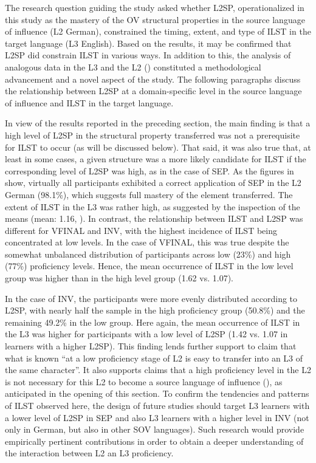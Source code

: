 \documentclass[output=paper,modfonts,nonflat, newtxmath]{langsci/langscibook}
\begin{document}
The research question guiding the study asked whether L2SP, operationalized in this study as the mastery of the OV structural properties in the source language of influence (L2 German), constrained the timing, extent, and type of ILST in the target language (L3 English). Based on the results, it may be confirmed that L2SP did constrain ILST in various ways. In addition to this, the analysis of analogous data in the L3 and the L2 (\citealt{Jarvis2000, FalkBardel2010}) constituted a methodological advancement and a novel aspect of the study. The following paragraphs discuss the relationship between L2SP at a domain-specific level in the source language of influence and ILST in the target language.

In view of the results reported in the preceding section, the main finding is that a high level of L2SP in the structural property transferred was not a prerequisite for ILST to occur (as will be discussed below). That said, it was also true that, at least in some cases, a given structure was a more likely candidate for ILST if the corresponding level of L2SP was high, as in the case of SEP. As the figures in  show, virtually all participants exhibited a correct application of SEP in the L2 German (98.1\%), which suggests full mastery of the element transferred. The extent of ILST in the L3 was rather high, as suggested by the inspection of the means (mean: 1.16, ). In contrast, the relationship between ILST and L2SP was different for VFINAL and INV, with the highest incidence of ILST being concentrated at low levels. In the case of VFINAL, this was true despite the somewhat unbalanced distribution of participants across low (23\%) and high (77\%) proficiency levels. Hence, the mean occurrence of ILST in the low level group was higher than in the high level group (1.62 vs. 1.07).

In the case of INV, the participants were more evenly distributed according to L2SP, with nearly half the sample in the high proficiency group (50.8\%) and the remaining 49.2\% in the low group. Here again, the mean occurrence of ILST in the L3 was higher for participants with a low level of L2SP (1.42 vs. 1.07 in learners with a higher L2SP). This finding lends further support to  claim that what is known “at a low proficiency stage of L2 is easy to transfer into an L3 of the same character”. It also supports claims that a high proficiency level in the L2 is not necessary for this L2 to become a source language of influence (\citealt{DeAngelis2007,Rast2010, SánchezBardel2017}), as anticipated in the opening of this section. To confirm the tendencies and patterns of ILST observed here, the design of future studies should target L3 learners with a lower level of L2SP in SEP and also L3 learners with a higher level in INV (not only in German, but also in other SOV languages). Such research would provide empirically pertinent contributions in order to obtain a deeper understanding of the interaction between L2 an L3 proficiency.
\end{document}
